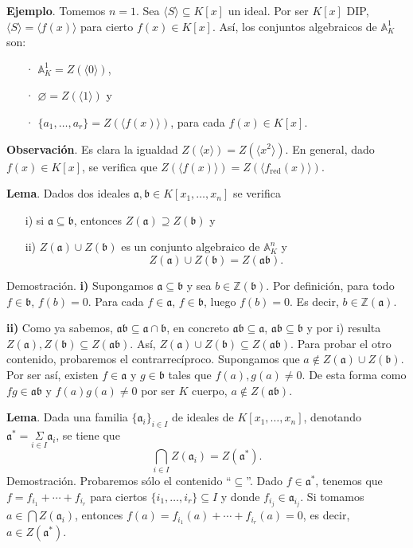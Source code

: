 \documentclass[a4paper,12pt]{article}
\newcommand{\Z}{\mathbb{Z}}
\newcommand{\A}{\mathbb{A}}
\newcommand{\af}{\mathfrak{a}}
\newcommand{\bfr}{\mathfrak{b}}
\begin{document}
\textbf{Ejemplo}. Tomemos $n=1$. Sea $\langle S\rangle\subseteq K[x]$ un ideal. Por ser $K[x]$ DIP, $\langle S\rangle=\langle f(x)\rangle$ para cierto $f(x)\in K[x]$. Así, los conjuntos algebraicos de $\A_K^1$ son:\begin{itemize}
    \item[·] $\A_K^1=Z(\langle 0\rangle)$,
    \item[·] $\varnothing=Z(\langle 1\rangle)$ y
    \item[·] $\{a_1,\dots,a_r\}=Z(\langle f(x)\rangle)$, para cada $f(x)\in K[x]$.
\end{itemize}

\textbf{Observación}. Es clara la igualdad $Z(\langle x\rangle)=Z(\langle x^2\rangle)$. En general, dado $f(x)\in K[x]$, se verifica que $Z(\langle f(x)\rangle)=Z(\langle f_{\text{red}}(x)\rangle)$.

\textbf{Lema}. Dados dos ideales $\af,\bfr\in K[x_1,\dots,x_n]$ se verifica\begin{itemize}
    \item[i)] si $\af\subseteq\bfr$, entonces $Z(\af)\supseteq Z(\bfr)$ y
    \item[ii)] $Z(\af)\cup Z(\bfr)$ es un conjunto algebraico de $\A_K^n$ y$$Z(\af)\cup Z(\bfr)=Z(\af\bfr).$$
\end{itemize}
Demostración. \textbf{i)} Supongamos $\af\subseteq\bfr$ y sea $b\in\Z(\bfr)$. Por definición, para todo $f\in\bfr$, $f(b)=0$. Para cada $f\in\af$, $f\in\bfr$, luego $f(b)=0$. Es decir, $b\in\Z(\af)$.

\textbf{ii)} Como ya sabemos, $\af\bfr\subseteq \af\cap\bfr$, en concreto $\af\bfr\subseteq\af$, $\af\bfr\subseteq\bfr$ y por i) resulta $Z(\af), Z(\bfr)\subseteq Z(\af\bfr)$. Así, $Z(\af)\cup Z(\bfr)\subseteq Z(\af\bfr)$. Para probar el otro contenido, probaremos el contrarrecíproco. Supongamos que $a\notin Z(\af)\cup Z(\bfr)$. Por ser así, existen $f\in\af$ y $g\in\bfr$ tales que $f(a),g(a)\neq 0$. De esta forma como $fg\in\af\bfr$ y $f(a)g(a)\neq 0$ por ser $K$ cuerpo, $a\notin Z(\af\bfr)$.

\textbf{Lema}. Dada una familia $\{\af_i\}_{i\in I}$ de ideales de $K[x_1,\dots,x_n]$, denotando $\af^*=\underset{i\in I}{\Sigma}\af_i$, se tiene que$$\bigcap_{i\in I}Z(\af_i)=Z(\af^*).$$
Demostración. Probaremos sólo el contenido ``$\subseteq$''. Dado $f\in\af^*$, tenemos que $f=f_{i_1}+\cdots+f_{i_r}$ para ciertos $\{i_1,\dots,i_r\}\subseteq I$ y donde $f_{i_j}\in\af_{i_j}$. Si tomamos $a\in\bigcap Z(\af_i)$, entonces $f(a)=f_{i_1}(a)+\cdots+f_{i_r}(a)=0$, es decir, $a\in Z(\af^*)$.
\end{document}
